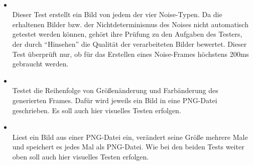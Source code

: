 \paragraph{}
\begin{itemize}
	\item{}~\\
	Dieser Test erstellt ein Bild von jedem der vier Noise-Typen. Da die erhaltenen Bilder bzw. der Nichtdeterminismus des Noises nicht automatisch getestet werden können, gehört ihre Prüfung zu den Aufgaben des Testers, der durch ``Hinsehen'' die Qualität der verarbeiteten Bilder bewertet. Dieser Test überprüft nur, ob für das Erstellen eines Noise-Frames höchstens 200ms gebraucht werden.
	
	\item{}~\\
	Testet die Reihenfolge von Größenänderung und Farbänderung des generierten Frames. Dafür wird jeweils ein Bild in eine PNG-Datei geschrieben. Es soll auch hier visuelles Testen erfolgen.
	
	\item{}~\\
	Liest ein Bild aus einer PNG-Datei ein, verändert seine Größe mehrere Male und speichert es jedes Mal als PNG-Datei. Wie bei den beiden Tests weiter oben soll auch hier visuelles Testen erfolgen.
	
\end{itemize}

\paragraph{}

